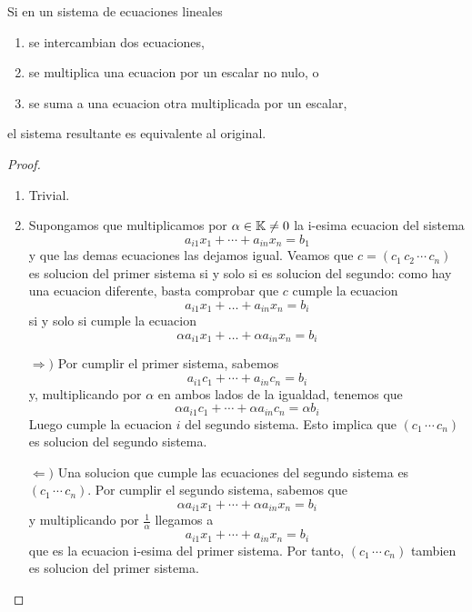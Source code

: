 \begin{proposition}
	Si en un sistema de ecuaciones lineales
	\begin{enumerate}
		\item se intercambian dos ecuaciones,
		\item se multiplica una ecuacion por un escalar no nulo, o
		\item se suma a una ecuacion otra multiplicada por un escalar,
	\end{enumerate}
	el sistema resultante es equivalente al original.
\end{proposition}
\begin{proof}
	\begin{enumerate}
		\item Trivial.
		\item Supongamos que multiplicamos por \(\alpha \in \mathbb{K} \neq  0\) la i-esima ecuacion del sistema
		      \[
			      a_{i1}x_1 + \cdots + a_{in}x_n = b_1
		      \]
		      y que las demas ecuaciones las dejamos igual. Veamos que \(c = (c_1 \, c_2 \, \cdots \, c_n )\) es solucion del primer sistema si y solo si es solucion del segundo: como hay una ecuacion diferente, basta comprobar que \(c \) cumple la ecuacion
		      \[
			      a_{i1}x_1 + \dots + a_{in}x_n = b_i
		      \]
		      si y solo si cumple la ecuacion
		      \[
			      \alpha a_{i1}x_1 + \dots + \alpha a_{in}x_n = b_i
		      \]

		      \(\Rightarrow )\) Por cumplir el primer sistema, sabemos
		      \[
			      a_{i1}c_1 + \cdots + a_{in}c_n = b_i
		      \]
		      y, multiplicando por \(\alpha\) en ambos lados de la igualdad, tenemos que
		      \[
			      \alpha a_{i1} c_1 + \cdots + \alpha a_{in}c_n = \alpha b_i
		      \]
		      Luego cumple la ecuacion \(i \) del segundo sistema. Esto implica que \((c_1 \, \cdots \, c_n )\) es solucion del segundo sistema.

		      \(\Leftarrow ) \) Una solucion que cumple las ecuaciones del segundo sistema es \((c_1 \, \cdots \, c_n )\). Por cumplir el segundo sistema, sabemos que
		      \[
			      \alpha a_{i1} x_1 + \cdots + \alpha a_{in} x_n = b_i
		      \]
		      y multiplicando por \(\frac{1}{\alpha}\) llegamos a
		      \[
			      a_{i1} x_1 + \cdots + a_{in}x_n = b_i
		      \]
		      que es la ecuacion i-esima del primer sistema. Por tanto, \((c_1 \, \cdots \, c_n )\) tambien es solucion del primer sistema.


\end{enumerate}
\end{proof}
